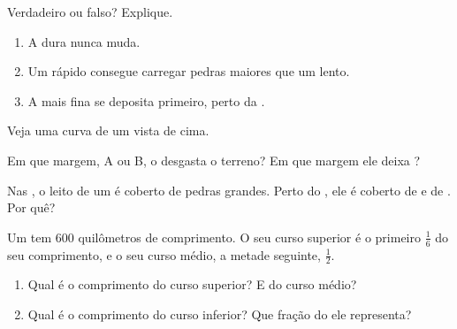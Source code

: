 \begin{exercise}[$\star$]\label{exo:g5:water-shapes-the-land:4}
Verdadeiro ou falso? Explique.
\begin{enumerate}
  \item[(a)] A  dura nunca muda.
  \item[(b)] Um  rápido consegue carregar pedras maiores que um  lento.
  \item[(c)] A  mais fina se deposita primeiro, perto da .
\end{enumerate}
\end{exercise}

\begin{exercise}[$\star$]\label{exo:g5:water-shapes-the-land:5}
Veja uma curva de um  vista de cima.

\begin{center}
\end{center}
Em que margem, A ou B, o  desgasta o terreno? Em que margem ele deixa
?
\end{exercise}

\begin{exercise}[$\star$]\label{exo:g5:water-shapes-the-land:6}
Nas , o leito de um  é coberto de pedras grandes. Perto do
, ele é coberto de  e de . Por quê?
\end{exercise}

\begin{exercise}[$\star\star$]\label{exo:g5:water-shapes-the-land:7}
Um  tem 600 quilômetros de comprimento. O seu curso superior é o
primeiro $\frac{1}{6}$ do seu comprimento, e o seu curso médio, a metade
seguinte, $\frac{1}{2}$.
\begin{enumerate}
  \item[(a)] Qual é o comprimento do curso superior? E do curso médio?
  \item[(b)] Qual é o comprimento do curso inferior? Que fração do  ele
        representa?
\end{enumerate}
\end{exercise}

